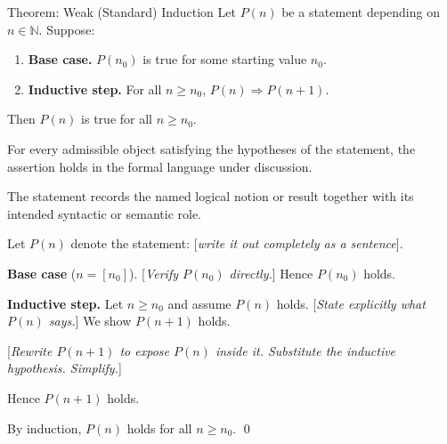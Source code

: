 \begin{propositionbox}{Theorem: Weak (Standard) Induction}
Let $P(n)$ be a statement depending on $n \in \mathbb{N}$. Suppose:
\begin{enumerate}[itemsep=2pt]
  \item \textbf{Base case.} $P(n_0)$ is true for some starting value $n_0$.
  \item \textbf{Inductive step.} For all $n \geq n_0$,
    $P(n) \Rightarrow P(n+1)$.
\end{enumerate}
Then $P(n)$ is true for all $n \geq n_0$.
\end{propositionbox}
\begin{remark*}
For every admissible object satisfying the hypotheses of the statement, the
assertion holds in the formal language under discussion.
\end{remark*}

\begin{remark*}[Interpretation]
The statement records the named logical notion or result together with its
intended syntactic or semantic role.
\end{remark*}


\begin{tcolorbox}[colback=gray!4, colframe=gray!35, arc=2pt,
  left=6pt, right=6pt, top=4pt, bottom=4pt,
  title={\small\textbf{Template: Weak Induction Proof}},
  fonttitle=\small\bfseries]
Let $P(n)$ denote the statement: [\emph{write it out completely as a sentence}].

\medskip
\noindent\textbf{Base case} ($n = [n_0]$).
[\emph{Verify $P(n_0)$ directly.}]
Hence $P(n_0)$ holds.

\medskip
\noindent\textbf{Inductive step.}
Let $n \geq n_0$ and assume $P(n)$ holds. [\emph{State explicitly
what $P(n)$ says.}]
We show $P(n+1)$ holds.

[\emph{Rewrite $P(n+1)$ to expose $P(n)$ inside it.
Substitute the inductive hypothesis. Simplify.}]

Hence $P(n+1)$ holds.

\medskip
\noindent By induction, $P(n)$ holds for all $n \geq n_0$. \qed
\end{tcolorbox}

